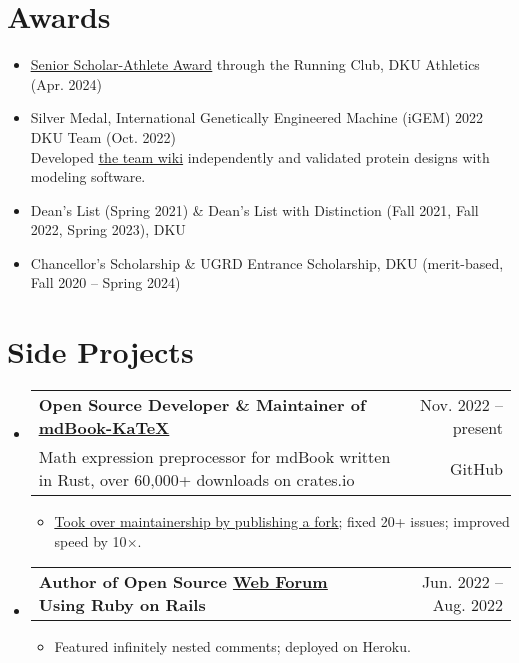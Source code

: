 \documentclass[letterpaper,11pt]{article}
\makeatletter
\newcommand{\CVItem}[1]{
  \item{\small
    {#1 \vspace{-2pt}}
  }
}
\newcommand{\CVSubheadingFrame}[1]{
  \vspace{-2pt}\item
    \begin{tabular*}{0.97\textwidth}[t]{l@{\extracolsep{\fill}}r}
        #1
    \end{tabular*}\vspace{-7pt}
}
\newcommand{\CVSubheading}[4]{\CVSubheadingFrame
    {\textbf{#1} & #2 \\
        \small#3 & #4 \\
    }}
\newcommand{\CVSubHeadingListStart}{\begin{itemize}[leftmargin=0.5cm, label={}]}
\newcommand{\CVSubHeadingListEnd}{\end{itemize}}
\newcommand{\CVItemListStart}{\begin{itemize}}
\newcommand{\CVItemListEnd}{\end{itemize}\vspace{-5pt}}
\newcommand{\uhref}[2]{\href{#1}{\underline{#2}}}
\makeatother
\begin{document}
\section{Awards}
\begin{itemize}
    \item \uhref{https://github.com/SichangHe/curriculum_vitae/files/15110729/scholar_athelete_award_DKU_running_club.pdf}
    {Senior Scholar-Athlete Award} through the Running Club,
    DKU Athletics (Apr. 2024)

    \item Silver Medal, International Genetically Engineered Machine (iGEM)
    2022 DKU Team (Oct. 2022)\\{\small
    Developed \uhref{https://github.com/SichangHe/igem-2022-dku-backup}
    {the team wiki} independently and
    validated protein designs with modeling software.
    }
    \vspace{-4pt}
    \item Dean's List (Spring 2021) \&
    Dean's List with Distinction (Fall 2021, Fall 2022, Spring 2023),
    DKU
    \vspace{-4pt}
    \item Chancellor's Scholarship \& UGRD Entrance Scholarship, DKU
    (merit-based, Fall 2020 -- Spring 2024)
    \vspace{-4pt}
\end{itemize}

\section{Side Projects}
\CVSubHeadingListStart
\CVSubheading
{Open Source Developer \& Maintainer of
    \uhref{https://github.com/lzanini/mdbook-katex}{mdBook-KaTeX}
}{Nov. 2022 -- present}
{Math expression preprocessor for mdBook written in Rust,
    over 60,000+ downloads on crates.io
}{GitHub}
\CVItemListStart
\CVItem
{\uhref{https://github.com/lzanini/mdbook-katex/issues/37}
    {Took over maintainership by publishing a fork};
    fixed 20+ issues; improved speed by 10$\times$.
}
\CVItemListEnd

\CVSubheadingFrame
{\textbf{Author of Open Source \uhref{https://github.com/SichangHe/rails_forum}
        {Web Forum} Using Ruby on Rails}&
    Jun. 2022 -- Aug. 2022
}
\CVItemListStart
\CVItem
{Featured infinitely nested comments;
    deployed on Heroku.
}
\CVItemListEnd
\CVSubHeadingListEnd
\end{document}
